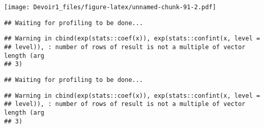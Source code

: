 \documentclass[]{article}
\newenvironment{Shaded}{\begin{snugshade}}{\end{snugshade}}
\newcommand{\KeywordTok}[1]{\textcolor[rgb]{0.13,0.29,0.53}{\textbf{#1}}}
\newcommand{\DataTypeTok}[1]{\textcolor[rgb]{0.13,0.29,0.53}{#1}}
\newcommand{\DecValTok}[1]{\textcolor[rgb]{0.00,0.00,0.81}{#1}}
\newcommand{\StringTok}[1]{\textcolor[rgb]{0.31,0.60,0.02}{#1}}
\newcommand{\OperatorTok}[1]{\textcolor[rgb]{0.81,0.36,0.00}{\textbf{#1}}}
\newcommand{\NormalTok}[1]{#1}
\begin{document}
\texttt{[image: Devoir1\_files/figure-latex/unnamed-chunk-91-2.pdf]}

\begin{Shaded}
\end{Shaded}

\begin{verbatim}
## Waiting for profiling to be done...
\end{verbatim}

\begin{verbatim}
## Warning in cbind(exp(stats::coef(x)), exp(stats::confint(x, level =
## level)), : number of rows of result is not a multiple of vector length (arg
## 3)
\end{verbatim}

\begin{verbatim}
## Waiting for profiling to be done...
\end{verbatim}

\begin{verbatim}
## Warning in cbind(exp(stats::coef(x)), exp(stats::confint(x, level =
## level)), : number of rows of result is not a multiple of vector length (arg
## 3)
\end{verbatim}
\end{document}
